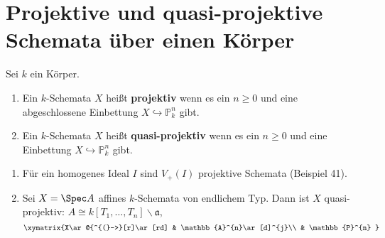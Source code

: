 \section{Projektive und quasi-projektive Schemata über einen Körper}
\begin{defn}[42]
Sei $k$ ein Körper.
\begin{enumerate}
\item Ein $k$-Schemata $X$ heißt \textbf{projektiv} wenn es ein $n\geq0$
und eine abgeschlossene Einbettung $X\hookrightarrow\mathbb{P}_{k}^{n}$
gibt.
\item Ein $k$-Schemata $X$ heißt \textbf{quasi-projektiv }wenn es ein
$n\geq0$ und eine Einbettung $X\hookrightarrow\mathbb{P}_{k}^{n}$
gibt.
\end{enumerate}
\end{defn}

\begin{example}[43]
\mbox{}
\begin{enumerate}
\item Für ein homogenes Ideal $I$ sind $V_{+}(I)$ projektive Schemata
(Beispiel 41).
\item Sei $X=\Spec A$ affines $k$-Schemata von endlichem Typ. Dann ist
$X$ quasi-projektiv: $A\cong k[T_{1},\ldots,T_{n}]\backslash\mathfrak{a}$,
\[
\xymatrix{X\ar@{^{(}->}[r]\ar[rd] & \mathbb{A}^{n}\ar[d]^{j}\\
 & \mathbb{P}^{n}
}
\]
\end{enumerate}
\end{example}

